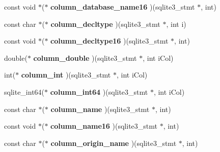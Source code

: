 \begin{DoxyCompactItemize}
const void $\ast$($\ast$ {\bfseries column\+\_\+database\+\_\+name16} )(sqlite3\+\_\+stmt $\ast$, int)
\item 
\mbox{\label{structsqlite3__api__routines_ae4e78358b212d7d37aa3a47058614c6f}} 
const char $\ast$($\ast$ {\bfseries column\+\_\+decltype} )(sqlite3\+\_\+stmt $\ast$, int i)
\item 
\mbox{\label{structsqlite3__api__routines_af5504d756c0ad0526acd0c44f9b2239a}} 
const void $\ast$($\ast$ {\bfseries column\+\_\+decltype16} )(sqlite3\+\_\+stmt $\ast$, int)
\item 
\mbox{\label{structsqlite3__api__routines_a6f10fb7f35cebf6cb62a77adfdc70efc}} 
double($\ast$ {\bfseries column\+\_\+double} )(sqlite3\+\_\+stmt $\ast$, int i\+Col)
\item 
\mbox{\label{structsqlite3__api__routines_a066b63e4ca0f83af9eaba45b8db3e6be}} 
int($\ast$ {\bfseries column\+\_\+int} )(sqlite3\+\_\+stmt $\ast$, int i\+Col)
\item 
\mbox{\label{structsqlite3__api__routines_a6992d17196cce6a9c893df0e69ea8b17}} 
sqlite\+\_\+int64($\ast$ {\bfseries column\+\_\+int64} )(sqlite3\+\_\+stmt $\ast$, int i\+Col)
\item 
\mbox{\label{structsqlite3__api__routines_a8ae08c78d80fae61c0abeb80a7cd70f5}} 
const char $\ast$($\ast$ {\bfseries column\+\_\+name} )(sqlite3\+\_\+stmt $\ast$, int)
\item 
\mbox{\label{structsqlite3__api__routines_a14ff9b029639553e11e610281097dfc7}} 
const void $\ast$($\ast$ {\bfseries column\+\_\+name16} )(sqlite3\+\_\+stmt $\ast$, int)
\item 
\mbox{\label{structsqlite3__api__routines_a944609a2b514a9002e3c76575ad3bd65}} 
const char $\ast$($\ast$ {\bfseries column\+\_\+origin\+\_\+name} )(sqlite3\+\_\+stmt $\ast$, int)
\item 
\mbox{\label{structsqlite3__api__routines_a29f148c32e2e8aba50d3ff3ffd8c4f90}} 

\end{DoxyCompactItemize}
